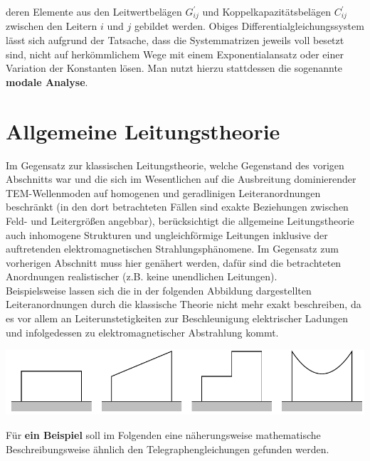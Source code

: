 deren Elemente aus den Leitwertbelägen $G_{i j}^{\prime}$ und Koppelkapazitätsbelägen $C_{i j}^{\prime}$ zwischen den Leitern $i$ und $j$ gebildet werden.
Obiges Differentialgleichungssystem lässt sich aufgrund der Tatsache, dass die Systemmatrizen jeweils voll besetzt sind, nicht auf herkömmlichem Wege mit einem Exponentialansatz oder einer Variation der Konstanten lösen. Man nutzt hierzu stattdessen die sogenannte \textbf{modale Analyse}.
\section{Allgemeine Leitungstheorie}\label{allgleit}
Im Gegensatz zur klassischen Leitungstheorie, welche Gegenstand des vorigen Abschnitts war und die sich im Wesentlichen auf die Ausbreitung dominierender TEM-Wellenmoden auf homogenen und geradlinigen Leiteranordnungen beschränkt (in den dort betrachteten Fällen sind exakte Beziehungen zwischen Feld- und Leitergrößen angebbar), berücksichtigt die allgemeine Leitungstheorie auch inhomogene Strukturen und ungleichförmige Leitungen inklusive der auftretenden elektromagnetischen Strahlungsphänomene. Im Gegensatz zum vorherigen Abschnitt muss hier genähert werden, dafür sind die betrachteten Anordnungen realistischer (z.B. keine unendlichen Leitungen).\\
Beispielsweise lassen sich die in der folgenden Abbildung dargestellten Leiteranordnungen durch die klassische Theorie nicht mehr exakt beschreiben, da es vor allem an Leiterunstetigkeiten zur Beschleunigung elektrischer Ladungen und infolgedessen zu elektromagnetischer Abstrahlung kommt.\\
\begin{center}
	\includegraphics{res/LT15}
\end{center}
Für \textbf{ein Beispiel} soll im Folgenden eine näherungsweise mathematische Beschreibungsweise ähnlich den Telegraphengleichungen gefunden werden.
